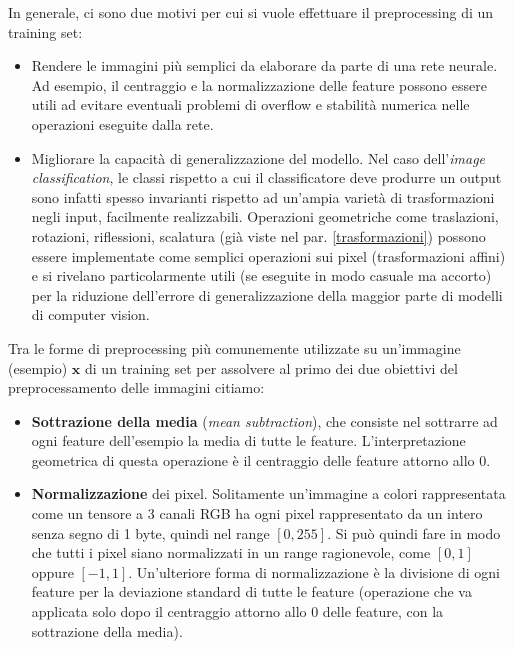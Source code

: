 In generale, ci sono due motivi per cui si vuole effettuare il preprocessing di un training set:

\begin{itemize}
\item Rendere le immagini più semplici da elaborare da parte di una rete neurale. Ad esempio, il centraggio e la normalizzazione delle feature possono essere utili ad evitare eventuali problemi di overflow e stabilità numerica nelle operazioni eseguite dalla rete.

\item Migliorare la capacità di generalizzazione del modello. Nel caso dell'\textit{image classification}, le classi rispetto a cui il classificatore deve produrre un output sono infatti spesso invarianti rispetto ad un'ampia varietà di trasformazioni negli input, facilmente realizzabili. Operazioni geometriche come traslazioni, rotazioni, riflessioni, scalatura (già viste nel par. \ref{trasformazioni}) possono essere implementate come semplici operazioni sui pixel (trasformazioni affini) e si rivelano particolarmente utili (se eseguite in modo casuale ma accorto) per la riduzione dell'errore di generalizzazione della maggior parte di modelli di computer vision.
\end{itemize}

Tra le forme di preprocessing più comunemente utilizzate su un'immagine (esempio) $\mathbf{x}$ di un training set per assolvere al primo dei due obiettivi del preprocessamento delle immagini citiamo:

\begin{itemize}
\item \textbf{Sottrazione della media} (\textit{mean subtraction}), che consiste nel sottrarre ad ogni feature dell'esempio la media di tutte le feature. L'interpretazione geometrica di questa operazione è il centraggio delle feature attorno allo 0.

\item \textbf{Normalizzazione} dei pixel. Solitamente un'immagine a colori rappresentata come un tensore a 3 canali RGB ha ogni pixel rappresentato da un intero senza segno di 1 byte, quindi nel range $[0,255]$. Si può quindi fare in modo che tutti i pixel siano normalizzati in un range ragionevole, come $ [0,1] $ oppure $ [-1,1] $.
Un'ulteriore forma di normalizzazione è la divisione di ogni feature per la deviazione standard di tutte le feature (operazione che va applicata solo dopo il centraggio attorno allo 0 delle feature, con la sottrazione della media).
\end{itemize}

